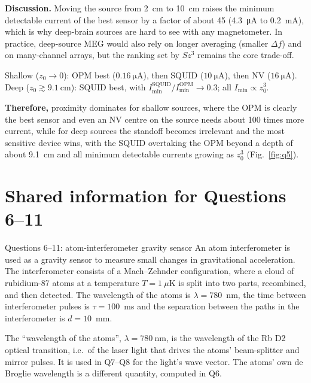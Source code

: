 \documentclass[11pt]{article}
\newcommand{\closing}[1]{\par\medskip\noindent\textbf{Therefore,} #1}
\begin{document}
\textbf{Discussion.} Moving the source from \SI{2}{\centi\metre} to \SI{10}{\centi\metre} raises the
minimum detectable current of the best sensor by a factor of about 45 (\SI{4.3}{\micro\ampere} to
\SI{0.2}{\milli\ampere}), which is why deep-brain sources are hard to see with any magnetometer.
In practice, deep-source MEG would also rely on longer averaging (smaller $\Delta f$) and on
many-channel arrays, but the ranking set by $S z^3$ remains the core trade-off.

\begin{answerbox}
Shallow ($z_0\to0$): OPM best ($\SI{0.16}{\micro\ampere}$), then SQUID ($\SI{10}{\micro\ampere}$), then NV
($\SI{16}{\micro\ampere}$). Deep ($z_0\gtrsim\SI{9.1}{\centi\metre}$): SQUID best, with
$I_{\min}^{\mathrm{SQUID}}/I_{\min}^{\mathrm{OPM}}\to0.3$; all $I_{\min}\propto z_0^3$.
\closing{proximity dominates for shallow sources, where the OPM is clearly the best sensor and even an
NV centre on the source needs about 100 times more current, while for deep sources the standoff
becomes irrelevant and the most sensitive device wins, with the SQUID overtaking the OPM beyond a depth
of about \SI{9.1}{\centi\metre} and all minimum detectable currents growing as $z_0^3$
(Fig.~\ref{fig:q5}).}
\end{answerbox}

\section{Shared information for Questions 6--11}

\begin{problembox}{Questions 6--11: atom-interferometer gravity sensor}
An atom interferometer is used as a gravity sensor to measure small changes in gravitational
acceleration. The interferometer consists of a Mach--Zehnder configuration, where a cloud of
rubidium-87 atoms at a temperature $T = 1~\mu\mathrm{K}$ is split into two parts, recombined, and
then detected. The wavelength of the atoms is $\lambda = 780$~nm, the time between interferometer
pulses is $\tau = 100$~ms and the separation between the paths in the interferometer is $d=10$~mm.
\end{problembox}

The ``wavelength of the atoms'', $\lambda = \SI{780}{\nano\metre}$, is the wavelength of the Rb D2
optical transition, i.e.\ of the laser light that drives the atoms' beam-splitter and mirror
pulses. It is used in Q7--Q8 for the light's wave vector. The atoms' own de Broglie wavelength is a
different quantity, computed in Q6.
\end{document}
